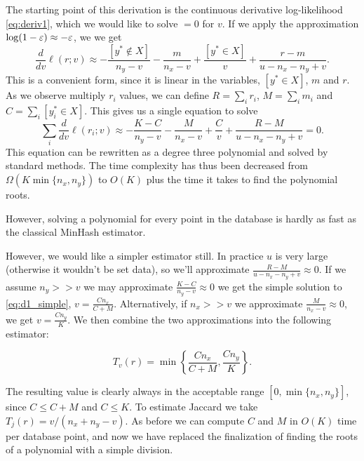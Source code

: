 The starting point of this derivation is the continuous derivative log-likelihood \cref{eq:deriv1},
which we would like to solve $=0$ for $v$.
If we apply the approximation $\log(1-\varepsilon) \approx -\varepsilon$,
we we get
\[
   \frac{d}{dv}\ell(r;v) \approx
   -\frac{[y^*\not\in X]}{n_y-v} 
   -\frac{m}{n_x-v} 
   +\frac{[y^*\in X]}{v} 
   +\frac{r-m}{u-n_x-n_y+v} 
   .
\]
This is a convenient form, since it is linear in the variables, $[y^*\in X]$, $m$ and $r$.
As we observe multiply $r_i$ values, we can define
$R = \sum_i r_i$, $M = \sum_i m_i$ and $C = \sum_i [y_i^*\in X]$.
This gives us a single equation to solve
\[
   \sum_i\frac{d}{dv}\ell(r_i; v) \approx
   -\frac{K-C}{n_y-v} 
   -\frac{M}{n_x-v} 
   +\frac{C}{v} 
   +\frac{R-M}{u-n_x-n_y+v} 
   = 0
   .
   \label{eq:d1_simple}
\]
This equation can be rewritten as a degree three polynomial and solved by standard methods.
The time complexity has thus been decreased from $\Omega(K\min\{n_x,n_y\})$ to $O(K)$ plus the time it takes to find the polynomial roots.

However, solving a polynomial for every point in the database is hardly as fast as the classical MinHash estimator.

However, we would like a simpler estimator still.
In practice $u$ is very large (otherwise it wouldn't be set data), so we'll approximate $\frac{R-M}{u-n_x-n_y+v}\approx 0$.
If we assume $n_y>\!>v$ we may approximate $\frac{K-C}{n_y-v}\approx 0$ we get the simple solution to \cref{eq:d1_simple}, $v=\frac{C n_x}{C+M}$.
Alternatively, if $n_x>\!>v$ we approximate $\frac{M}{n_x-v}\approx 0$, we get $v=\frac{C n_y}{K}$.
We then combine the two approximations into the following estimator:
\begin{definition}
\[
   T_v(r) = \min\left\{\frac{C n_x}{C+M}, \frac{C n_y}{K}\right\}.
   \label{eq:minner}
\]
\end{definition}

The resulting value is clearly always in the acceptable range $[0,\min\{n_x, n_y\}]$, since $C\le C+M$ and $C \le K$.
To estimate Jaccard we take $T_j(r) = v/(n_x + n_y - v)$.
As before we can compute $C$ and $M$ in $O(K)$ time per database point, and now we have replaced the finalization of finding the roots of a polynomial with a simple division.

\smallskip

